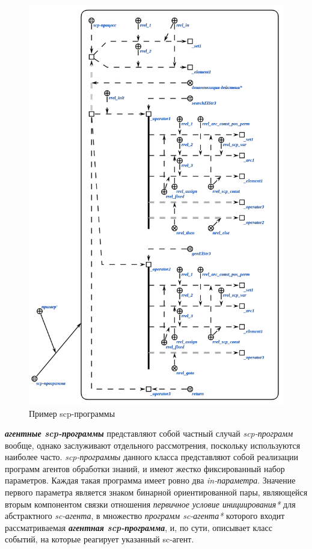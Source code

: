 \begin{figure}[H]
	\centering
	\includegraphics[scale=0.8]{images/part3/chapter_situation_management/program_example.png}
	\caption{Пример scp-программы}
	\label{fig:program_example}
\end{figure}

\textbf{\textit{агентные scp-программы}} представляют собой частный случай \textit{scp-программ} вообще, однако заслуживают отдельного рассмотрения, поскольку используются наиболее часто. \textit{scp-программы} данного класса представляют собой реализации программ агентов обработки знаний, и имеют жестко фиксированный набор параметров. Каждая такая программа имеет ровно два \textit{in-параметра\scnrolesign}. Значение первого параметра является знаком бинарной ориентированной пары, являющейся вторым компонентом связки отношения \textit{первичное условие инициирования*} для абстрактного \textit{sc-агента}, в множество \textit{программ sc-агента*} которого входит рассматриваемая \textbf{\textit{агентная scp-программа}}, и, по сути, описывает класс событий, на которые реагирует указанный sc-агент.
	
